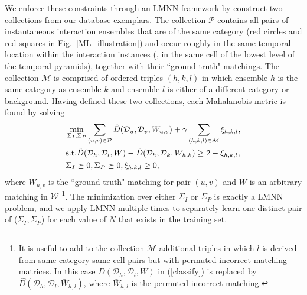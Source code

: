We enforce these constraints through an LMNN framework by construct two collections from our database exemplars. The collection $\mathcal{P}$ contains all pairs of instantaneous interaction ensembles that are of the same category (red circles and red squares in Fig.~\ref{ML_illustration}) and occur roughly in the same temporal location within the interaction instances (\ie, in the same cell of the lowest level of the temporal pyramids), together with their ``ground-truth" matchings. The collection $\mathcal{M}$ is comprised of ordered triples $(h,k,l)$ in which ensemble $h$ is the same category as ensemble $k$ and ensemble $l$ is either of a different category or background. Having defined these two collections, each Mahalanobis metric is found by solving
\begin{equation}
\vspace{-5pt}
\label{classify}
\begin{split}
&\min_{\Sigma_{I}, \Sigma_{P}} \sum_{(u,v)\in\mathcal{P}}\hat{D}(\mathcal{D}_{u}, \mathcal{D}_{v}, W_{u,v})+\gamma\sum_{(h,k,l)\in\mathcal{M}}\xi_{h,k,l},\\
&\textup{s.t.}  \hat{D}(\mathcal{D}_{h}, \mathcal{D}_{l}, W)-\hat{D}(\mathcal{D}_{h}, \mathcal{D}_{k}, W_{h,k})\ge 2-\xi_{h,k,l},\\
& \Sigma_{I}\succeq 0, \Sigma_{P}\succeq 0, \xi_{h,k,l}\ge0,
\end{split}
\end{equation}
where $W_{u,v}$ is the ``ground-truth" matching for pair $(u,v)$ and $W$ is an arbitrary matching in $\mathcal{W}$ \footnote{It is useful to add to the collection $\mathcal{M}$ additional triples in which $l$ is derived from same-category same-cell pairs but with permuted incorrect matching matrices. In this case $\hat{D}(\mathcal{D}_{h}, \mathcal{D}_{l}, W)$ in (\ref{classify}) is replaced by $\hat{D}(\mathcal{D}_{h}, \mathcal{D}_{l}, \bar{W}_{h,l})$, where $\bar{W}_{h,l}$ is the permuted incorrect matching.}. The minimization over either $\Sigma_{I}$ or $\Sigma_{P}$ is exactly a LMNN problem\cite{Weinberger:ML}, and we apply LMNN multiple times to separately learn one distinct pair of ($\Sigma_{I}, \Sigma_{P}$) for each value of $N$ that exists in the training set. 


